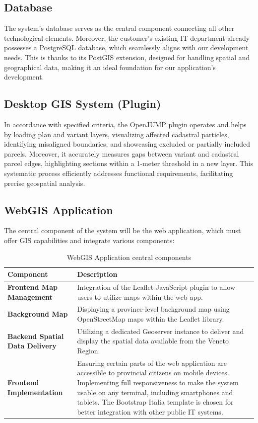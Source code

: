 \subsection{Database}\label{subsec:database}
The system's database serves as the central component connecting all other technological elements.
Moreover, the customer's existing IT department already possesses a PostgreSQL database, which seamlessly aligns with our development needs.
This is thanks to its PostGIS extension, designed for handling spatial and geographical data, making it an ideal foundation for our application's development.

\subsection{Desktop GIS System (Plugin)}\label{subsec:openjump-plugin}
In accordance with specified criteria, the OpenJUMP plugin operates and helps by loading plan and variant layers, visualizing affected cadastral particles, identifying misaligned boundaries, and showcasing excluded or partially included parcels.
Moreover, it accurately measures gaps between variant and cadastral parcel edges, highlighting sections within a 1-meter threshold in a new layer.
This systematic process efficiently addresses functional requirements, facilitating precise geospatial analysis.

\subsection{WebGIS Application}\label{subsec:webgis-application}
The central component of the system will be the web application, which must offer GIS capabilities and integrate various components:

\begin{table}[htbp]
    \centering
    \renewcommand{\arraystretch}{1.1}
    \begin{tabular}{|l|p{9cm}|}
        \hline
        \textbf{Component} & \textbf{Description} \\
        \hline
        \textbf{Frontend Map Management} & Integration of the Leaflet JavaScript plugin to allow users to utilize maps within the web app. \\
        \hline
        \textbf{Background Map} & Displaying a province-level background map using OpenStreetMap maps within the Leaflet library. \\
        \hline
        \textbf{Backend Spatial Data Delivery} & Utilizing a dedicated Geoserver instance to deliver and display the spatial data available from the Veneto Region. \\
        \hline
        \textbf{Frontend Implementation} & Ensuring certain parts of the web application are accessible to provincial citizens on mobile devices. Implementing full responsiveness to make the system usable on any terminal, including smartphones and tablets. The Bootstrap Italia template is chosen for better integration with other public IT systems. \\
        \hline
    \end{tabular}
    \caption{WebGIS Application central components \label{tab:table-web-components}}
\end{table}

